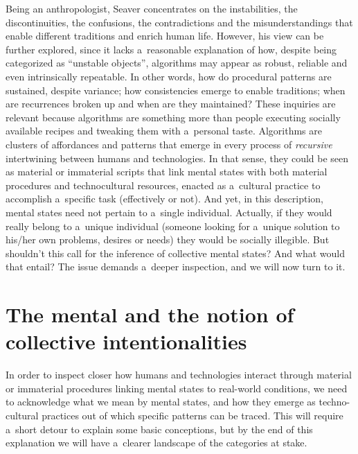 Being an anthropologist, Seaver concentrates on the instabilities, the discontinuities, the confusions, the contradictions and the misunderstandings that enable different traditions and enrich human life. However, his view can be further explored, since it lacks a~reasonable explanation of how, despite being categorized as ``unstable objects'', algorithms may appear as robust, reliable and even intrinsically repeatable. In other words, how do procedural patterns are sustained, despite variance; how consistencies emerge to enable traditions; when are recurrences broken up and when are they maintained? These inquiries are relevant because algorithms are something more than people executing socially available recipes and tweaking them with a~personal taste. Algorithms are clusters of affordances and patterns that emerge in every process of \textit{recursive} intertwining between humans and technologies. In that sense, they could be seen as material or immaterial scripts that link mental states with both material procedures and technocultural resources, enacted as a~cultural practice to accomplish a~specific task (effectively or not). And yet, in this description, mental states need not pertain to a~single individual. Actually, if they would really belong to a~unique individual (someone looking for a~unique solution to his/her own problems, desires or needs) they would be socially illegible. But shouldn't this call for the inference of collective mental states? And what would that entail? The issue demands a~deeper inspection, and we will now turn to it.

\section*{The mental and the notion of collective intentionalities}
In order to inspect closer how humans and technologies interact through material or immaterial procedures linking mental states to real-world conditions, we need to acknowledge what we mean by mental states, and how they emerge as techno-cultural practices out of which specific patterns can be traced. This will require a~short detour to explain some basic conceptions, but by the end of this explanation we will have a~clearer landscape of the categories at stake.


